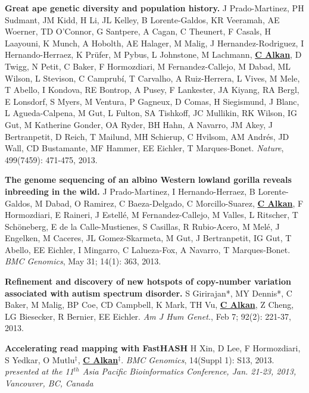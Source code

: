  \vspace{-.2cm}
        {\bf Great ape genetic diversity and population history.}
        J Prado-Martinez, PH Sudmant, JM Kidd, H Li, JL Kelley, B Lorente-Galdos, KR Veeramah, AE Woerner, TD O’Connor, G Santpere, A Cagan, C Theunert, F Casals, H Laayouni, K Munch, A Hobolth, AE Halager, M Malig, J Hernandez-Rodriguez, I Hernando-Herraez, K Prüfer, M Pybus, L Johnstone, M Lachmann, {\bf {\underline {C Alkan}}}, D Twigg, N Petit, C Baker, F Hormozdiari, M Fernandez-Callejo, M Dabad, ML Wilson, L Stevison, C Camprubí, T Carvalho, A Ruiz-Herrera, L Vives, M Mele, T Abello, I Kondova, RE Bontrop, A Pusey, F Lankester, JA Kiyang, RA Bergl, E Lonsdorf, S Myers, M Ventura, P Gagneux, D Comas, H Siegismund, J Blanc, L Agueda-Calpena, M Gut, L Fulton, SA Tishkoff, JC Mullikin, RK Wilson, IG Gut, M Katherine Gonder, OA Ryder, BH Hahn, A Navarro, JM Akey, J Bertranpetit, D Reich, T Mailund, MH Schierup, C Hvilsom, AM Andrés, JD Wall, CD Bustamante, MF Hammer, EE Eichler, T Marques-Bonet. 
        {\em Nature}, 499(7459): 471-475, 2013.

        

\vspace{-.2cm}
        {\bf The genome sequencing of an albino Western lowland gorilla reveals inbreeding in the wild.}
        J Prado-Martinez, I Hernando-Herraez, B Lorente-Galdos, M Dabad, O Ramirez, C Baeza-Delgado, C Morcillo-Suarez, 
        {\bf {\underline {C Alkan}}}, F Hormozdiari, E Raineri, J Estellé, M Fernandez-Callejo, M Valles, L Ritscher, T Schöneberg, E de la Calle-Mustienes, 
        S Casillas, R Rubio-Acero, M Melé, J Engelken, M Caceres, JL Gomez-Skarmeta, M Gut, J Bertranpetit, IG Gut, T Abello, 
        EE Eichler, I Mingarro, C Lalueza-Fox, A Navarro, T Marques-Bonet.
        {\em BMC Genomics}, May 31; 14(1): 363, 2013.

 \vspace{-.2cm}
        {\bf Refinement and discovery of new hotspots of copy-number variation associated with autism spectrum disorder.}
        S Girirajan*, MY Dennis*, C Baker, M Malig, BP Coe, CD Campbell, K Mark, TH Vu,
        {\bf {\underline {C Alkan}}}, Z Cheng, LG Biesecker, R Bernier, EE Eichler.
        {\em Am J Hum Genet.}, Feb 7; 92(2): 221-37, 2013.

 \vspace{-.2cm}
        {\bf Accelerating read mapping with FastHASH}
        H Xin, D Lee, F Hormozdiari, S Yedkar, O Mutlu$^\ddag$, {\bf {\underline {C Alkan}}}$^\ddag$.
        {\em BMC Genomics}, 14(Suppl 1): S13, 2013.\\
        \hspace*{1cm} {\footnotesize {\em presented at the  11$^{th}$  Asia Pacific Bioinformatics Conference,
            Jan. 21-23, 2013, Vancouver, BC, Canada}}
       
